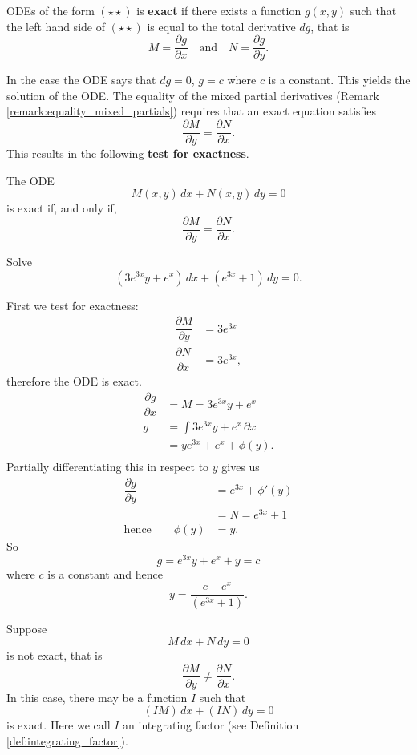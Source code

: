 \begin{definition}
    ODEs of the form $(\star\star)$ is \textbf{exact} if there exists a function $g(x,y)$ such that the left hand side of $(\star\star)$ is equal to the total derivative $dg$, that is \[M=\dfrac{\partial g}{\partial x}\quad\text{and}\quad N=\dfrac{\partial g}{\partial y}.\]
\end{definition}

In the case the ODE says that $dg=0$, $g=c$ where $c$ is a constant. This yields the solution of the ODE. The equality of the mixed partial derivatives (Remark \ref{remark:equality_mixed_partials}) requires that an exact equation satisfies \[\dfrac{\partial M}{\partial y}=\dfrac{\partial N}{\partial x}.\] This results in the following \textbf{test for exactness}.

The ODE \[M(x,y)\,dx+N(x,y)\,dy=0\] is exact if, and only if, \[\dfrac{\partial M}{\partial y}=\dfrac{\partial N}{\partial x}.\]

\begin{example}
    Solve \[(3e^{3x}y+e^x)\,dx+(e^{3x}+1)\,dy=0.\]
    
    First we test for exactness:
    \begin{align*}
        \dfrac{\partial M}{\partial y}&=3e^{3x}\\
        \dfrac{\partial N}{\partial x}&=3e^{3x},
    \end{align*}
    therefore the ODE is exact.
    \begin{align*}
        \dfrac{\partial g}{\partial x}&=M=3e^{3x}y+e^x\\
        g&=\int 3e^{3x}y+e^x\,\partial x\\
        &=ye^{3x}+e^x+\phi(y).\\
    \end{align*}
    Partially differentiating this in respect to $y$ gives us
    \begin{align*}
        \dfrac{\partial g}{\partial y}&=e^{3x}+\phi'(y)\\
        &=N=e^{3x}+1\\
        \text{hence}\qquad\phi(y)&=y.
    \end{align*}
    So \[g=e^{3x}y+e^x+y=c\] where $c$ is a constant and hence \[y=\dfrac{c-e^x}{(e^{3x}+1)}.\]
\end{example}

Suppose \[M\,dx+N\,dy=0\] is not exact, that is \[\dfrac{\partial M}{\partial y}\neq\dfrac{\partial N}{\partial x}.\] In this case, there may be a function $I$ such that \[(IM)\,dx+(IN)\,dy=0\] is exact. Here we call $I$ an integrating factor (see Definition \ref{def:integrating_factor}).

